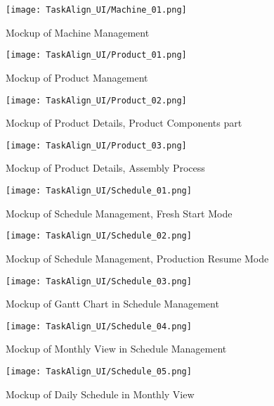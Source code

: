 \begin{adjustwidth}{-.85in}{-.85in}

\begin{figure}[!h]
    \centering
    \texttt{[image: TaskAlign\_UI/Machine\_01.png]}
    \caption{Mockup of Machine Management} 
\end{figure}

\begin{figure}[h]
    \centering
    \texttt{[image: TaskAlign\_UI/Product\_01.png]}
    \caption{Mockup of Product Management} 
\end{figure}

\begin{figure}[h]
    \centering
    \texttt{[image: TaskAlign\_UI/Product\_02.png]}
    \caption{Mockup of Product Details, Product Components part} 
\end{figure}

\begin{figure}[h]
    \centering
    \texttt{[image: TaskAlign\_UI/Product\_03.png]}
    \caption{Mockup of Product Details, Assembly Process}
\end{figure}

\begin{figure}[h]
    \centering
    \texttt{[image: TaskAlign\_UI/Schedule\_01.png]}
    \caption{Mockup of Schedule Management, Fresh Start Mode} 
\end{figure}

\begin{figure}[h]
    \centering
    \texttt{[image: TaskAlign\_UI/Schedule\_02.png]}
    \caption{Mockup of Schedule Management, Production Resume Mode} 
\end{figure}

\begin{figure}[h]
    \centering
    \texttt{[image: TaskAlign\_UI/Schedule\_03.png]}
    \caption{Mockup of Gantt Chart in Schedule Management} 
\end{figure}

\begin{figure}[h]
    \centering
    \texttt{[image: TaskAlign\_UI/Schedule\_04.png]}
    \caption{Mockup of Monthly View in Schedule Management} 
\end{figure}

\begin{figure}[h]
    \centering
    \texttt{[image: TaskAlign\_UI/Schedule\_05.png]}
    \caption{Mockup of Daily Schedule in Monthly View} 
\end{figure}

\end{adjustwidth}
    
